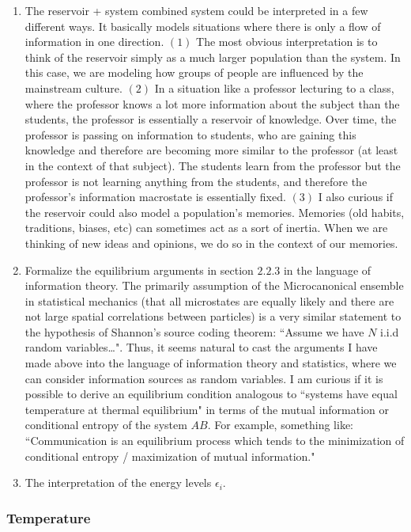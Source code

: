 \documentclass{article}
\begin{document}
\begin{enumerate}
    \item The reservoir + system combined system could be interpreted in a few different ways. It basically models situations where there is only a flow of information in one direction. $(1)$ The most obvious interpretation is to think of the reservoir simply as a much larger population than the system. In this case, we are modeling how groups of people are influenced by the mainstream culture. $(2)$ In a situation like a professor lecturing to a class, where the professor knows a lot more information about the subject than the students, the professor is essentially a reservoir of knowledge. Over time, the professor is passing on information to students, who are gaining this knowledge and therefore are becoming more similar to the professor (at least in the context of that subject). The students learn from the professor but the professor is not learning anything from the students, and therefore the professor's information macrostate is essentially fixed. $(3)$ I also curious if the reservoir could also model a population's memories. Memories (old habits, traditions, biases, etc) can sometimes act as a sort of inertia. When we are thinking of new ideas and opinions, we do so in the context of our memories. 
    \item Formalize the equilibrium arguments in section $2.2.3$ in the language of information theory. The primarily assumption of the Microcanonical ensemble in statistical mechanics (that all microstates are equally likely and there are not large spatial correlations between particles) is a very similar statement to the hypothesis of Shannon's source coding theorem: ``Assume we have $N$ i.i.d random variables\dots". Thus, it seems natural to cast the arguments I have made above into the language of information theory and statistics, where we can consider information sources as random variables. I am curious if it is possible to derive an equilibrium condition analogous to ``systems have equal temperature at thermal equilibrium" in terms of the mutual information or conditional entropy of the system $AB$. For example, something like: ``Communication is an equilibrium process which tends to the minimization of conditional entropy / maximization of mutual information."
    \item The interpretation of the energy levels $\epsilon_i$.
\end{enumerate}



\subsubsection{Temperature}
\end{document}

